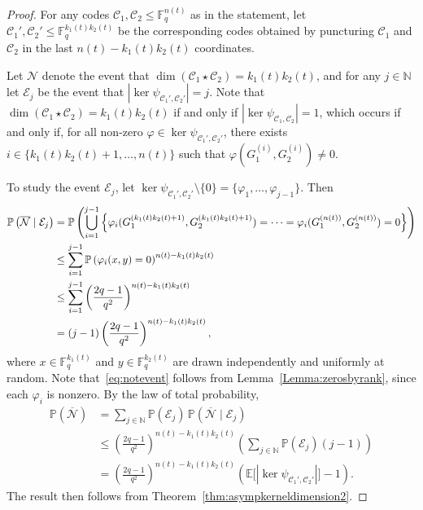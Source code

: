 \documentclass[a4paper,11pt,reqno]{article}
\newcommand{\F}{\mathbb{F}}
\newcommand{\C}{\mathcal{C}}
\theoremstyle{plain} \numberwithin{equation}{section}
\theoremstyle{definition}
\begin{document}
\begin{proof}
For any codes $\C_1, \C_2 \leq \F_q^{n(t)}$ as in the statement, let $\C_1', \C_2' \leq \F_q^{k_1(t)k_2(t)}$ be the corresponding codes obtained by puncturing $\C_1$ and $\C_2$ in the last $n(t) - k_1(t)k_2(t)$ coordinates. 

Let $\mathcal{N}$ denote the event that $\dim(\C_1 \star \C_2) = k_1(t)k_2(t)$, and for any $j \in \mathbb{N}$ let $\mathcal{E}_j$ be the event that $|\ker\psi_{\C_1', \C_2'}| = j$. 
Note that $\dim(\C_1 \star \C_2) = k_1(t)k_2(t)$ if and only if $|\ker\psi_{\C_1, \C_2}| = 1$, which occurs if and only if, for all non-zero $\varphi \in \ker\psi_{\C_1', \C_2'}$, there exists $i \in \{k_1(t)k_2(t) + 1, \ldots, n(t)\}$ such that $\varphi(G_1^{(i)}, G_2^{(i)}) \neq 0$.

To study the event $\mathcal{E}_j$, let 
$\ker\psi_{\C_1', \C_2'} \setminus \{0\} = \{\varphi_1, \ldots, \varphi_{j-1}\}$. 
Then
\begin{align}
    \mathbb{P} \left(\overline{\mathcal{N}} \mid \mathcal{E}_j\right)
    &= \mathbb{P} \left(
        \bigcup_{i=1}^{j-1}
        \left\{
            \varphi_i(G_1^{(k_1(t)k_2(t)+1)}, G_2^{(k_1(t)k_2(t)+1)}) 
            = \cdots = 
            \varphi_i(G_1^{(n(t))}, G_2^{(n(t))}) = 0
        \right\}
    \right)\notag \\
    &\leq \sum_{i=1}^{j-1} 
        \mathbb{P} \left(\varphi_i(x, y) = 0\right)^{n(t) - k_1(t)k_2(t)} \notag \\
    &\leq \sum_{i=1}^{j-1} 
        \left(\frac{2q - 1}{q^2}\right)^{n(t) - k_1(t)k_2(t)} \label{eq:notevent} \\
    &= (j - 1)
        \left(\frac{2q - 1}{q^2}\right)^{n(t) - k_1(t)k_2(t)}, \notag
\end{align}
where $x \in \F_q^{k_1(t)}$ and $y \in \F_q^{k_2(t)}$ are drawn independently and uniformly at random. 
Note that~\eqref{eq:notevent} follows from Lemma~\ref{Lemma:zerosbyrank}, since each $\varphi_i$ is nonzero. By the law of total probability, 
\begin{align*}
    \mathbb{P}(\overline{\mathcal{N}}) 
    &= \sum_{j \in \mathbb{N}} 
        \mathbb{P}(\mathcal{E}_j)\,
        \mathbb{P}(\overline{\mathcal{N}} \mid \mathcal{E}_j) \\
    &\leq 
        \left(\frac{2q - 1}{q^2}\right)^{n(t) - k_1(t)k_2(t)} 
        \left( \sum_{j \in \mathbb{N}} 
            \mathbb{P}(\mathcal{E}_j)(j - 1)
        \right) \\ 
    &= 
        \left(\frac{2q - 1}{q^2}\right)^{n(t) - k_1(t)k_2(t)} 
        \left( \mathbb{E} \big[|\ker\psi_{\C_1', \C_2'}|\big] - 1 \right).
\end{align*}
The result then follows from Theorem~\ref{thm:asympkerneldimension2}.
\end{proof}
\end{document}
